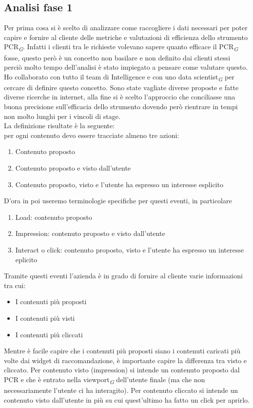 \documentclass[a4paper, 12pt, twoside, openright]{book}
\newcommand{\gloss}[1]{#1\textsubscript{\textit{\tiny{G}}}}
\begin{document}
\subsection{Analisi fase 1}
Per prima cosa si è scelto di analizzare come raccogliere i dati necessari per poter capire e fornire al cliente delle metriche e valutazioni di efficienza dello strumento \gloss{PCR}. Infatti i clienti tra le richieste volevano sapere quanto efficace il \gloss{PCR} fosse, questo però è un concetto non basilare e non definito dai clienti stessi perciò molto tempo dell'analisi è stato impiegato a pensare come valutare questo.\\
Ho collaborato con tutto il team di Intelligence e con uno \gloss{data scientist} per cercare di definire questo concetto. Sono state vagliate diverse proposte e fatte diverse ricerche in internet, alla fine si è scelto l'approccio che conciliasse una buona precisione sull'efficacia dello strumento dovendo però rientrare in tempi non molto lunghi per i vincoli di stage.\\
La definizione risultate è la seguente:\\
per ogni contenuto devo essere tracciate almeno tre azioni:
\begin{enumerate}
\item Contenuto proposto
\item Contenuto proposto e visto dall'utente
\item Contenuto proposto, visto e l'utente ha espresso un interesse esplicito
\end{enumerate}
D'ora in poi useremo terminologie specifiche per questi eventi, in particolare
\begin{enumerate}
\item Load: contenuto proposto
\item Impression: contenuto proposto e visto dall'utente
\item Interact o click: contenuto proposto, visto e l'utente ha espresso un interesse eplicito
\end{enumerate}
Tramite questi eventi l'azienda è in grado di fornire al cliente varie informazioni tra cui:
\begin{itemize}
\item I contenuti più proposti
\item I contenuti più visti
\item I contenuti più cliccati
\end{itemize}
Mentre è facile capire che i contenuti più proposti siano i contenuti caricati più volte dai widget di raccomandazione, è importante capire la differenza tra visto e cliccato. Per contenuto visto (impression) si intende un contenuto proposto dal PCR e che è entrato nella \gloss{viewport} dell'utente finale (ma che non necessariamente l'utente ci ha interagito). Per contenuto cliccato si intende un contenuto visto dall'utente in più su cui quest'ultimo ha fatto un click per aprirlo.\\
\end{document}
